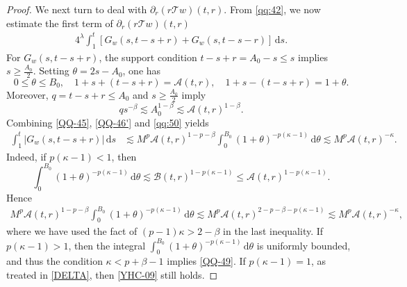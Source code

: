 \documentclass[10pt,a4paper]{amsart}
\newcommand{\Acal}{\mathcal A}
\newcommand{\Bcal}{\mathcal B}
\newcommand{\Tcal}{\mathcal T}
\newcommand{\dd}{\,\mathrm{d}}
\newcommand{\f}{\frac}
\newcommand{\p}{\partial}
\begin{document}
\begin{proof}
We next turn to deal with $\p_r(r\Tcal w)(t,r)$. From \eqref{qq:42}, we now estimate the first term of $\p_r(r\Tcal w)(t,r)$
\begin{equation}\label{YHC-08}
\begin{aligned}
4^\lambda
\int_1^t
\left[
G_w(s,t-s+r)
+
G_w(s,t-s-r)
\right]\dd s.
\end{aligned}
\end{equation}
For $G_w(s,t-s+r)$, the support condition
$t-s+r=A_0-s\leq s$ implies $s\geq\f{A_0}{2}$.
Setting $\theta=2s-A_0$, one has
\begin{equation}\label{QQ-46}
0\leq\theta\leq B_0,
\quad
1+s+(t-s+r)=\Acal(t,r),
\quad
1+s-(t-s+r)=1+\theta.
\end{equation}
Moreover, $q=t-s+r\leq A_0$ and $s\geq \f{A_0}{2}$ imply
\begin{equation}\label{QQ-46'}
q s^{-\beta}
\lesssim
A_0^{1-\beta}
\lesssim
\Acal(t,r)^{1-\beta}.
\end{equation}
Combining \eqref{QQ-45},  \eqref{QQ-46'} and \eqref{qq:50} yields
\begin{equation}\label{QQ-49}
\begin{aligned}
\int_1^t
|G_w(s,t-s+r)|\dd s
&\lesssim
M^p
\Acal(t,r)^{1-p-\beta}
\int_0^{B_0}
(1+\theta)^{-p(\kappa-1)}\dd\theta\lesssim
M^p\Acal(t,r)^{-\kappa}.
\end{aligned}
\end{equation}
Indeed, if $p(\kappa-1)<1$, then
\[
\int_0^{B_0}
(1+\theta)^{-p(\kappa-1)}\dd\theta
\lesssim
\Bcal(t,r)^{1-p(\kappa-1)}
\leq
\Acal(t,r)^{1-p(\kappa-1)}.
\]
Hence
\begin{equation}\label{YHC-09}
\begin{aligned}
M^p\Acal(t,r)^{1-p-\beta}
\int_0^{B_0}
(1+\theta)^{-p(\kappa-1)}\dd\theta
\lesssim M^p
\Acal(t,r)^{2-p-\beta-p(\kappa-1)}
\lesssim
M^p\Acal(t,r)^{-\kappa},
\end{aligned}
\end{equation}
where  we have used the fact of
$(p-1)\kappa>2-\beta$ in the last inequality.
If $p(\kappa-1)>1$, then the integral $\int_0^{B_0}
(1+\theta)^{-p(\kappa-1)}\dd\theta$ is uniformly bounded, and thus the condition
$\kappa<p+\beta-1$ implies \eqref{QQ-49}.
If $p(\kappa-1)=1$, as treated in \eqref{DELTA}, then \eqref{YHC-09} still holds.



\end{proof}
\end{document}
